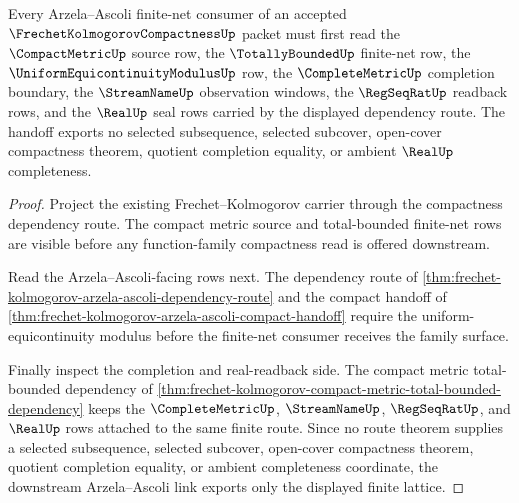 \begin{theorem}
\label{thm:frechet-kolmogorov-downstream-arzela-link}
Every Arzela--Ascoli finite-net consumer of an accepted $\FrechetKolmogorovCompactnessUp$ packet must first read the $\CompactMetricUp$ source row, the $\TotallyBoundedUp$ finite-net row, the $\UniformEquicontinuityModulusUp$ row, the $\CompleteMetricUp$ completion boundary, the $\StreamNameUp$ observation windows, the $\RegSeqRatUp$ readback rows, and the $\RealUp$ seal rows carried by the displayed dependency route. The handoff exports no selected subsequence, selected subcover, open-cover compactness theorem, quotient completion equality, or ambient $\RealUp$ completeness.
\end{theorem}
\begin{proof}
Project the existing Frechet--Kolmogorov carrier through the compactness dependency route. The compact metric source and total-bounded finite-net rows are visible before any function-family compactness read is offered downstream.

Read the Arzela--Ascoli-facing rows next. The dependency route of \autoref{thm:frechet-kolmogorov-arzela-ascoli-dependency-route} and the compact handoff of \autoref{thm:frechet-kolmogorov-arzela-ascoli-compact-handoff} require the uniform-equicontinuity modulus before the finite-net consumer receives the family surface.

Finally inspect the completion and real-readback side. The compact metric total-bounded dependency of \autoref{thm:frechet-kolmogorov-compact-metric-total-bounded-dependency} keeps the $\CompleteMetricUp$, $\StreamNameUp$, $\RegSeqRatUp$, and $\RealUp$ rows attached to the same finite route. Since no route theorem supplies a selected subsequence, selected subcover, open-cover compactness theorem, quotient completion equality, or ambient completeness coordinate, the downstream Arzela--Ascoli link exports only the displayed finite lattice.
\end{proof}

